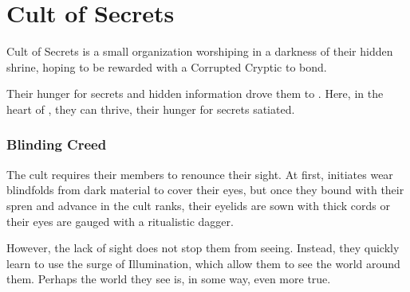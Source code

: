 \section{Cult of Secrets}
\label{enemyFractionCorruptedLightweavers}

Cult of Secrets is a small organization worshiping \npcSjaAnat{} in a darkness of their hidden shrine, hoping to be rewarded with a Corrupted Cryptic to bond. 

Their hunger for secrets and hidden information drove them to \locationTashikk{}. Here, in the heart of \locationYeddaw{}, they can thrive, their hunger for secrets satiated.

\subsubsection{Blinding Creed}

The cult requires their members to renounce their sight. At first, initiates wear blindfolds from dark material to cover their eyes, but once they bound with their spren and advance in the cult ranks, their eyelids are sown with thick cords or their eyes are gauged with a ritualistic dagger.

However, the lack of sight does not stop them from seeing. Instead, they quickly learn to use the surge of Illumination, which allow them to see the world around them. Perhaps the world they see is, in some way, even more true.




\newpage

\newpage

\newpage

\newpage
